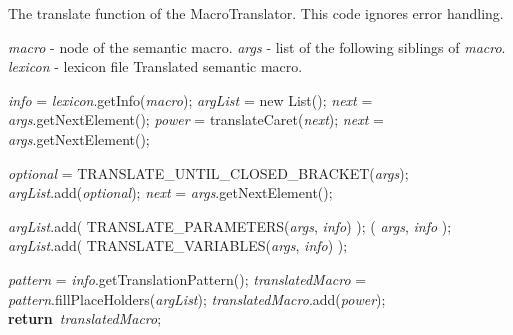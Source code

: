 \documentclass[a4paper,11pt]{article}
\newcommand{\NULL}{\textbf{null}}
\renewcommand{\Return}{\textbf{return}}
\theoremstyle{defTheoStyle}
\theoremstyle{defExampStyle}
\begin{document}
\begin{algorithm}[!ht]
\caption{The translate function of the MacroTranslator. This code ignores error handling.}\label{alg:macro-translation}
	\begin{algorithmic}[1]
	\Require 
		\Statex \textit{macro} - node of the semantic macro. 
		\Statex \textit{args} - list of the following siblings of \textit{macro}. 
		\Statex \textit{lexicon} - lexicon file
	\Ensure 
		\Statex Translated semantic macro.
	
	\State \textit{info} = \textit{lexicon}.getInfo(\textit{macro});\label{line:get_info}
	\State \textit{argList} = new List(); 
	\State \textit{next} = \textit{args}.getNextElement();
	\label{line:next_caret}
		\State \textit{power} = translateCaret(\textit{next});
		\State \textit{next} = \textit{args}.getNextElement();
	\EndIf
	
	\While{\textit{next} is $[$}\label{line:next_optional} 
		\State \textit{optional} = {\scriptsize TRANSLATE\_UNTIL\_CLOSED\_BRACKET}(\textit{args});
		\State \textit{argList}.add(\textit{optional});
		\State \textit{next} = \textit{args}.getNextElement();
	\EndWhile
	
	\State \textit{argList}.add( {\scriptsize TRANSLATE\_PARAMETERS}(\textit{args}, \textit{info}) ); \label{line:trans_paras} 
	( \textit{args}, \textit{info} );  \label{line:skip_ats} 
	\State \textit{argList}.add( {\scriptsize TRANSLATE\_VARIABLES}(\textit{args}, \textit{info}) ); \label{line:trans_vars} 
	
	\State \textit{pattern} = \textit{info}.getTranslationPattern();
	\State \textit{translatedMacro} = \textit{pattern}.fillPlaceHolders(\textit{argList});\label{line:fill_pattern}
	\If{\textit{power} is not \NULL}\label{line:shifted_exp}
		\State \textit{translatedMacro}.add(\textit{power});
	\EndIf
	\State \Return\ \textit{translatedMacro};
	\EndProcedure
	\end{algorithmic}
\end{algorithm}
\end{document}
